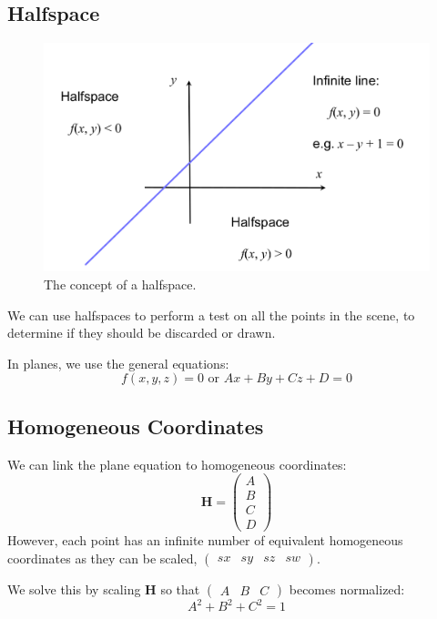 \documentclass[11pt]{article}
\begin{document}
\subsection{Halfspace}
\begin{figure}[htb!]
  \caption{The concept of a halfspace.}
  \includegraphics[scale=0.3]{halfspace}
  \centering
\end{figure}
We can use halfspaces to perform a test on all the points in the scene, to determine if they should be discarded or drawn.

In planes, we use the general equations:
\[
  f(x, y, z) = 0 \text{ or } Ax + By + Cz + D = 0
\]

\subsection{Homogeneous Coordinates}
We can link the plane equation to homogeneous coordinates:
\[
  \bm{H} = \begin{pmatrix} A \\ B \\ C \\ D \end{pmatrix}  
\]
However, each point has an infinite number of equivalent homogeneous coordinates as they can be scaled, $\begin{pmatrix} sx & sy & sz & sw \end{pmatrix}$.

We solve this by scaling $\bm{H}$ so that $\begin{pmatrix} A & B & C \end{pmatrix}$ becomes normalized:
\[
  A^2 + B^2 + C^2 = 1  
\]
\end{document}
